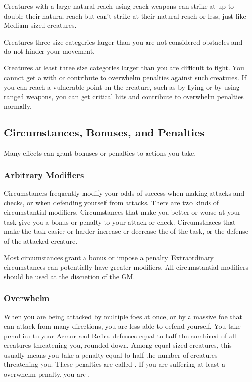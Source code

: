             Creatures with a large natural reach using reach weapons can strike at up to double their natural reach but can't strike at their natural reach or less, just like Medium sized creatures.

             Creatures three size categories larger than you are not considered obstacles and do not hinder your movement.

             Creatures at least three size categories larger than you are difficult to fight. You cannot get a  with  or contribute to overwhelm penalties against such creatures. If you can reach a vulnerable point on the creature, such as by flying or by using ranged weapons, you can get critical hits and contribute to overwhelm penalties normally.

    \subsection{Circumstances, Bonuses, and Penalties}

        Many effects can grant bonuses or penalties to actions you take.

        \subsubsection{Arbitrary Modifiers}

            Circumstances frequently modify your odds of success when making attacks and checks, or when defending yourself from attacks.
            There are two kinds of circumstantial modifiers.
            Circumstances that make you better or worse at your task give you a bonus or penalty to your attack or check.
            Circumstnaces that make the task easier or harder increase or decrease the  of the task, or the defense of the attacked creature.

            Most circumstances grant a  bonus or impose a  penalty.
            Extraordinary circumstances can potentially have greater modifiers.
            All circumstantial modifiers should be used at the discretion of the GM.\@

        \subsubsection{Overwhelm}\label{Overwhelm}
            When you are being attacked by multiple foes at once, or by a massive foe that can attack from many directions, you are less able to defend yourself.
            You take penalties to your Armor and Reflex defenses equal to half the combined  of all creatures threatening you, rounded down.
            Among equal sized creatures, this usually means you take a penalty equal to half the number of creatures threatening you.
            These penalties are called .
            If you are suffering at least a  overwhelm penalty, you are .

